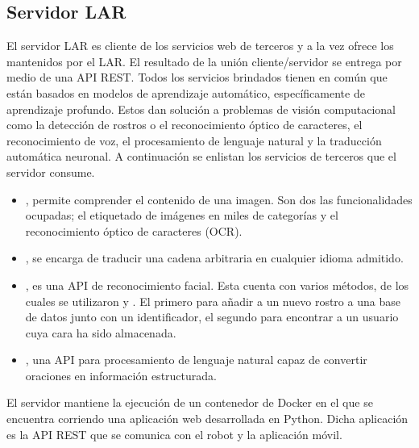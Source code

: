


\subsection{Servidor LAR}
\label{\detokenize{chapter_two/desc_cloudnao:servidor-lar}}
El servidor LAR es cliente de los servicios web de terceros y a la vez
ofrece los mantenidos por el LAR.
El resultado de la unión cliente/servidor se
entrega por medio de una
API REST.
Todos los servicios brindados tienen en común que están basados en modelos de
aprendizaje automático, específicamente de aprendizaje profundo. Estos dan solución
a problemas de visión computacional como la detección de rostros o el
reconocimiento óptico de caracteres, el reconocimiento
de voz, el procesamiento de lenguaje natural y la traducción automática
neuronal. A continuación se enlistan los servicios de terceros que el servidor
consume.
\begin{itemize}
\item {} 
, permite comprender el contenido de una imagen. Son dos las funcionalidades ocupadas; el etiquetado de imágenes en miles de categorías y el reconocimiento óptico de caracteres (OCR).


\item {} 
, se encarga de traducir una cadena arbitraria en cualquier idioma admitido.

\item {} 
, es una API de reconocimiento facial. Esta cuenta con varios métodos, de los cuales se utilizaron  y . El primero para añadir a un nuevo rostro a una base de datos junto con un identificador, el segundo para encontrar a un usuario cuya cara ha sido almacenada.

\item {} 
, una API para procesamiento de lenguaje natural capaz de convertir oraciones en información estructurada.

\end{itemize}

El servidor mantiene la ejecución de un contenedor de
Docker en el que se encuentra corriendo una aplicación web desarrollada en Python.
Dicha aplicación es la API REST que se comunica con el robot y la aplicación móvil.

